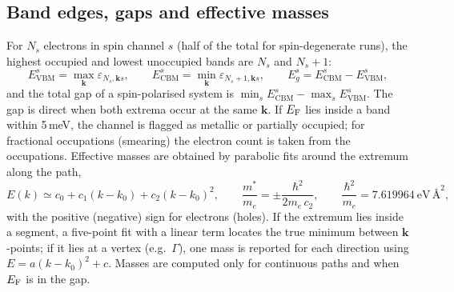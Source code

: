 \subsection{Band edges, gaps and effective masses}
For $N_s$ electrons in spin channel $s$ (half of the total for spin-degenerate runs), the highest occupied and lowest unoccupied bands are $N_s$ and $N_s+1$:
\begin{equation}
E_\mathrm{VBM}^{s}=\max_{\bm{k}}\varepsilon_{N_s,\bm{k} s},\qquad E_\mathrm{CBM}^{s}=\min_{\bm{k}}\varepsilon_{N_s+1,\bm{k} s},\qquad E_g^{s}=E_\mathrm{CBM}^{s}-E_\mathrm{VBM}^{s},
\end{equation}
and the total gap of a spin-polarised system is $\min_s E_\mathrm{CBM}^{s}-\max_s E_\mathrm{VBM}^{s}$. The gap is direct when both extrema occur at the same $\bm{k}$. If $E_\mathrm{F}$ lies inside a band within 5\,meV, the channel is flagged as metallic or partially occupied; for fractional occupations (smearing) the electron count is taken from the occupations. Effective masses are obtained by parabolic fits around the extremum along the path,
\begin{equation}
E(k)\simeq c_0+c_1(k-k_0)+c_2(k-k_0)^2,\qquad \frac{m^*}{m_e}=\pm\frac{\hbar^2}{2m_e\,c_2},\qquad \frac{\hbar^2}{m_e}=7.619964\ \mathrm{eV\,\text{\AA}^2},
\end{equation}
with the positive (negative) sign for electrons (holes). If the extremum lies inside a segment, a five-point fit with a linear term locates the true minimum between $\bm{k}$-points; if it lies at a vertex (e.g.\ $\Gamma$), one mass is reported for each direction using $E=a(k-k_0)^2+c$. Masses are computed only for continuous paths and when $E_\mathrm{F}$ is in the gap.


